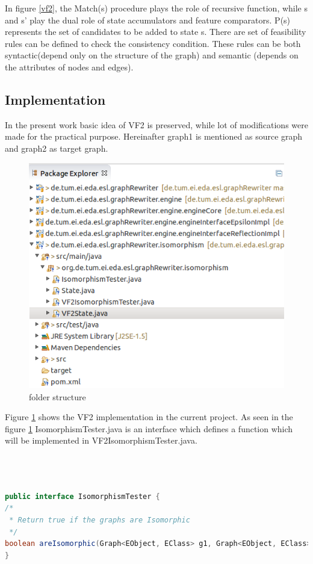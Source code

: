 In figure \ref{vf2}, the Match(s) procedure plays the role of recursive function, while s and s' play the dual role of state accumulators and feature comparators. P(s) represents the set of candidates to be added to state s. There are set of feasibility rules can be defined to check the consistency condition. These rules can be both syntactic(depend only on the structure of the graph) and semantic (depends on the attributes of nodes and edges).

\subsection{Implementation}
In the present work basic idea of VF2 is preserved, while lot of modifications were made for the
practical purpose. Hereinafter graph1 is mentioned as source graph and graph2 as target graph.
 
\begin{figure}
\centerline{
\includegraphics[width=0.6\columnwidth]{figures/folder.png}
}
\caption{folder structure}
\label{folder}
\end{figure}

Figure \ref{folder} shows the VF2 implementation in the current project.
As seen in the figure \ref{folder}
IsomorphismTester.java is an interface which defines a function which will be implemented in VF2IsomorphismTester.java.
\\
\\
\\
\\

\begin{lstlisting}[language = Java,frame = single]
public interface IsomorphismTester {
/*
 * Return true if the graphs are Isomorphic
 */
boolean areIsomorphic(Graph<EObject, EClass> g1, Graph<EObject, EClass> g2);
}
\end{lstlisting}

